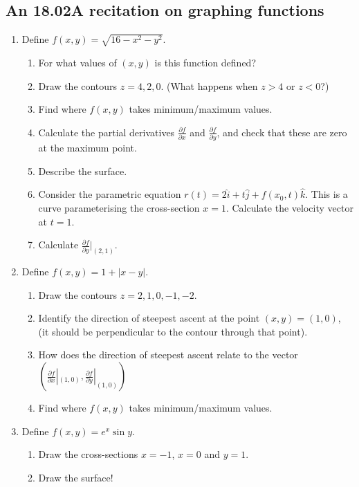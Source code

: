 \documentclass[11pt]{article}
\begin{document}
\begin{1802Graphing}

\subsection*{An 18.02A recitation on graphing functions}

\begin{enumerate}\squishlist
\item Define $f(x,y)=\sqrt{16-x^2-y^2}$.
\begin{enumerate}
\item For what values of $(x,y)$ is this function defined?
\item Draw the contours $z=4,2,0$. (What happens when $z>4$ or $z<0$?)
\item Find where $f(x,y)$ takes minimum/maximum values.
\item Calculate the partial derivatives $\frac{\partial f}{\partial x}$ and $\frac{\partial f}{\partial y}$, and check that these are zero at the maximum point.
\item Describe the surface.
\item Consider the parametric equation $r(t)=2\hat i + t\hat j + f(x_0,t)\hat k$. This is a curve parameterising the cross-section $x=1$. Calculate the velocity vector at $t=1$. 
\item Calculate $\frac{\partial f}{\partial y}\bigr|_{(2,1)}$.
\end{enumerate}
\item Define  $f(x,y)=1+|x-y|$.
\begin{enumerate}
\item Draw the contours $z=2,1,0,-1,-2$.
\item Identify the direction of steepest ascent at the point $(x,y)=(1,0)$, (it should be perpendicular to the contour through that point).
\item How does the direction of steepest ascent relate to the vector $\left(\frac{\partial f}{\partial x}|_{(1,0)},\frac{\partial f}{\partial y}|_{(1,0)}\right)$
\item Find where $f(x,y)$ takes minimum/maximum values.
\end{enumerate}
\item Define  $f(x,y)=e^{x}\sin y$.
\begin{enumerate}
\item Draw the cross-sections $x=-1$, $x=0$ and $y=1$.
\item Draw the surface!

\end{enumerate}
\end{enumerate}
\end{1802Graphing}
\end{document}
